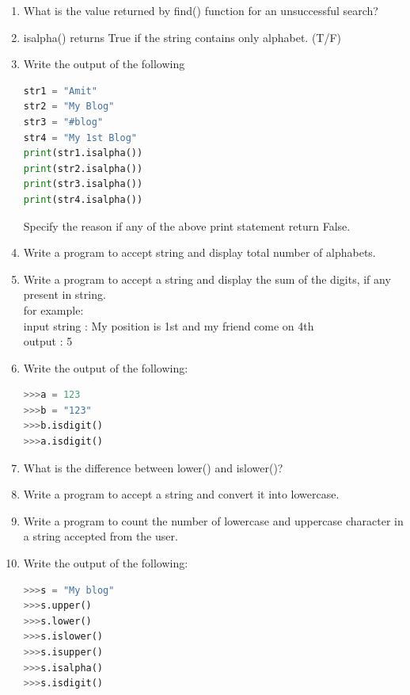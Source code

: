 \documentclass[12pt,a4paper]{article}
\begin{document}
\begin{enumerate}[label=\textbf{Q\arabic*.}]

\item What is the value returned by find() function for an unsuccessful search?

\item isalpha() returns True if the string contains only alphabet. (T/F)

\item Write the output of the following
\begin{lstlisting}[language=Python]
str1 = "Amit"
str2 = "My Blog"
str3 = "#blog"
str4 = "My 1st Blog"
print(str1.isalpha())
print(str2.isalpha())
print(str3.isalpha())
print(str4.isalpha())
\end{lstlisting}
Specify the reason if any of the above print statement return False.

\item Write a program to accept string and display total number of alphabets.

\item Write a program to accept a string and display the sum of the digits, if any present in string. \\
for example: \\
input string : My position is 1st and my friend come on 4th \\
output : 5

\item Write the output of the following:
\begin{lstlisting}[language=Python]
>>>a = 123
>>>b = "123"
>>>b.isdigit()
>>>a.isdigit()
\end{lstlisting}

\item What is the difference between lower() and islower()?

\item Write a program to accept a string and convert it into lowercase.

\item Write a program to count the number of lowercase and uppercase character in a string accepted from the user.

\item Write the output of the following:
\begin{lstlisting}[language=Python]
>>>s = "My blog"
>>>s.upper()
>>>s.lower()
>>>s.islower()
>>>s.isupper()
>>>s.isalpha()
>>>s.isdigit()
\end{lstlisting}

\end{enumerate}
\end{document}
